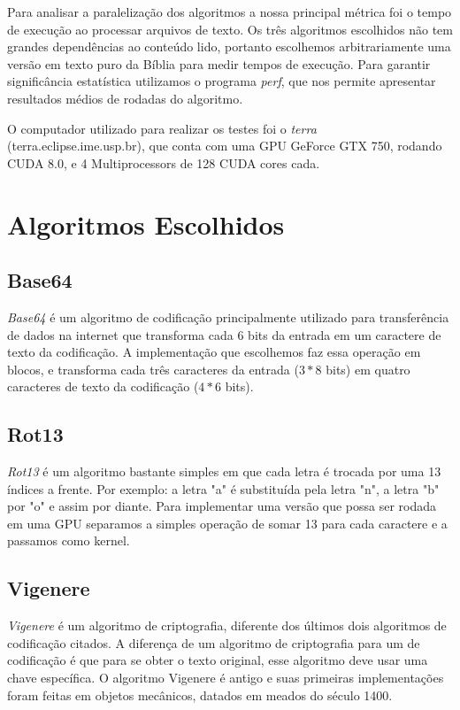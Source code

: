 \documentclass[12pt]{article}
\begin{document}
Para analisar a paralelização dos algoritmos a nossa principal métrica
foi o tempo de execução ao processar arquivos de texto. Os três 
algoritmos escolhidos não tem grandes dependências ao conteúdo lido, 
portanto escolhemos arbitrariamente uma versão em texto puro da Bíblia
para medir tempos de execução. Para garantir significância estatística
utilizamos o programa \emph{perf}, que nos permite apresentar resultados
médios de rodadas do algoritmo.

O computador utilizado para realizar os testes foi o \emph{terra} 
(terra.eclipse.ime.usp.br), que conta com uma GPU GeForce GTX 750,
rodando CUDA 8.0, e 4 Multiprocessors de 128 CUDA cores cada. 

\newpage
\section{Algoritmos Escolhidos}
\subsection{Base64}
\emph{Base64} é um algoritmo de codificação principalmente utilizado 
para transferência de dados na internet que transforma cada 6 bits 
da entrada em um caractere de texto da codificação. A implementação que 
escolhemos faz essa operação em blocos, e transforma cada três
caracteres da entrada ($3 * 8$ bits) em quatro caracteres de texto da
codificação ($4 * 6$ bits).

\subsection{Rot13}
\emph{Rot13} é um algoritmo bastante simples em que cada letra é
trocada por uma 13 índices a frente. Por exemplo: a letra "a" é
substituída pela letra "n", a letra "b" por "o" e assim por diante.
Para implementar uma versão que possa ser rodada em uma GPU separamos
a simples operação de somar 13 para cada caractere e a passamos como
kernel. 

\subsection{Vigenere}
\emph{Vigenere} é um algoritmo de criptografia, diferente dos últimos 
dois algoritmos de codificação citados. A diferença de um algoritmo de
criptografia para um de codificação é que para se obter o texto 
original, esse algoritmo deve usar uma chave específica. O algoritmo
Vigenere é antigo e suas primeiras implementações foram feitas em 
objetos mecânicos, datados em meados do século 1400.
\end{document}
